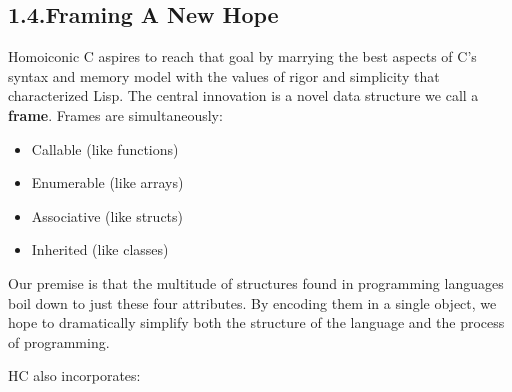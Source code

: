 \documentclass[preprint]{{sigplanconf}}
\begin{document}
\subsection{1.4.\hspace*{0.5em}Framing A New Hope}\label{sec-frames}%

\noindent Homoiconic C aspires to reach that goal by marrying the best aspects of
C's syntax and memory model with the values of rigor and simplicity that
characterized Lisp. The central innovation is a novel data structure we
call a \textbf{frame}. Frames are simultaneously:%

\begin{itemize}[noitemsep,topsep=\mdcompacttopsep]%

\item Callable (like functions)%

\item Enumerable (like arrays)%

\item Associative (like structs)%

\item Inherited (like classes)%
\end{itemize}%

\noindent Our premise is that the multitude of structures found in programming
languages boil down to just these four attributes. By encoding
them in a single object, we hope to dramatically simplify both the structure
of the language and the process of programming.%

HC also incorporates:%
\end{document}
